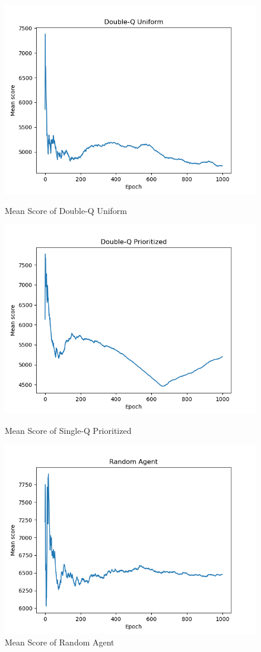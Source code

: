 \documentclass[conference]{IEEEtran}
\begin{document}
\begin{figure}[h]
\centering
\begin{minipage}{.5\textwidth}
     \centering
    \includegraphics[width=.91\textwidth]{DQU.png}
    \caption{Mean Score of Double-Q Uniform}
\end{minipage}%
\begin{minipage}{.5\textwidth}
     \centering
    \includegraphics[width=.91\textwidth]{DQP.png}
    \caption{Mean Score of Single-Q Prioritized}
\end{minipage}

\centering
\begin{minipage}{.5\textwidth}
    \centering
    \includegraphics[width=.91\textwidth]{rand.png}
    \caption{Mean Score of Random Agent}
\end{minipage}%
\end{figure}
\end{document}
